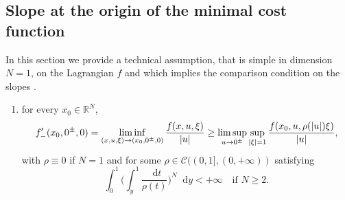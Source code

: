 \documentclass[JEP,XML,SOM,Unicode,published]{cedram}
\theoremstyle{plain}
\theoremstyle{definition}
\newcommand{\dd}{\mathop{}\mathopen{}\mathrm{d}}
\newcommand{\R}{\mathbb{R}}
\newcommand{\Cspace}{\mathscr{C}}
\DeclarePairedDelimiter{\abs}{\lvert}{\rvert}
\begin{document}
\subsection{Slope at the origin of the minimal cost function}\label{sectionSlopeOrigin}

In this section we provide a technical assumption, that is simple in dimension $N=1$, on the Lagrangian $f$ and which implies the comparison condition on the slopes .

\begin{enumerate}[\textnormal{(S)},leftmargin=1.5\normalparindent]
\item\label{hypSlopeLagrangian} for every $x_0\in \R^N$,
\begin{equation}\label{slopeInf}
f'_-(x_0,0^\pm,0) = \displaystyle\liminf_{(x,u,\xi) \to (x_0,0^\pm,0)} \frac{f(x,u,\xi)}{\abs{u}} \geq
\limsup_{u\to 0^\pm}\sup_{\abs{\xi}= 1}\frac{f(x_0,u,\rho(\abs{u})\xi)}{\abs{u}},
\end{equation}
with \(\rho\equiv 0\) if \(N=1\) and for some \(\rho\in\Cspace((0,1],(0,+\infty))\) satisfying
\[
\int_0^1\Big(\int_y^1\frac{\dd t}{\rho(t)}\Big)^N\dd y<+\infty\quad\text{if \(N\geq 2\)}.
\]
\end{enumerate}
\end{document}
